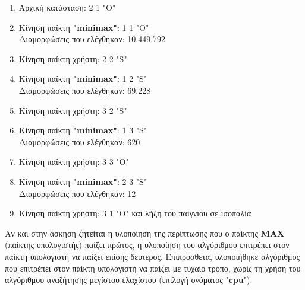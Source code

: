 \documentclass{article}
\begin{document}
\begin{enumerate}\addtocounter{enumi}{-1}
    \item Αρχική κατάσταση: 2 1 "O"
    \item Κίνηση παίκτη \textbf{"minimax"}: 1 1 "O"\\ Διαμορφώσεις που ελέγθηκαν: 10.449.792 
    \item Κίνηση παίκτη χρήστη: 2 2 "S"
    \item Κίνηση παίκτη \textbf{"minimax"}: 1 2 "S"\\ Διαμορφώσεις που ελέγθηκαν: 69.228
    \item Κίνηση παίκτη χρήστη: 3 2 "S"
    \item Κίνηση παίκτη \textbf{"minimax"}: 1 3 "S"\\ Διαμορφώσεις που ελέγθηκαν: 620 
    \item Κίνηση παίκτη χρήστη: 3 3 "O"
    \item Κίνηση παίκτη \textbf{"minimax"}: 2 3 "S"\\ Διαμορφώσεις που ελέγθηκαν: 12
    \item Κίνηση παίκτη χρήστη: 3 1 "O" και λήξη του παίγνιου σε ισοπαλία
\end{enumerate}
Αν και στην άσκηση ζητείται η υλοποίηση της περίπτωσης που ο παίκτης \textbf{MAX} (παίκτης υπολογιστής) παίζει 
πρώτος, η υλοποίηση του αλγόριθμου επιτρέπει στον παίκτη υπολογιστή να παίξει επίσης δεύτερος. Επιπρόσθετα,
υλοποιήθηκε αλγόριθμος που επιτρέπει στον παίκτη υπολογιστή να παίζει με τυχαίο τρόπο, χωρίς τη χρήση του αλγόριθμου
αναζήτησης μεγίστου-ελαχίστου (επιλογή ονόματος "\textbf{cpu}").
\end{document}
